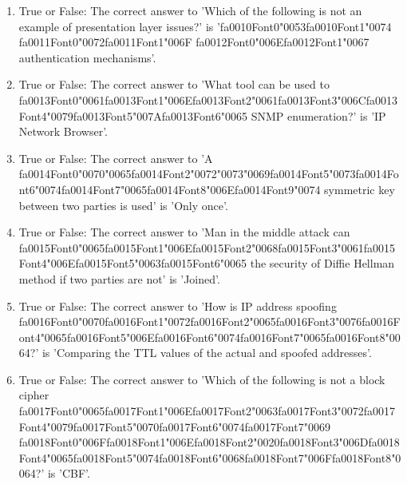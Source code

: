 \documentclass[12pt]{article}
\begin{document}
\begin{enumerate}[label=\arabic*.]
\item True or False: The correct answer to 'Which of the following is not an example of presentation layer issues?' is '{\csname fa0010Font0\endcsname\char"0053}{\csname fa0010Font1\endcsname\char"0074} {\csname fa0011Font0\endcsname\char"0072}{\csname fa0011Font1\endcsname\char"006F} {\csname fa0012Font0\endcsname\char"006E}{\csname fa0012Font1\endcsname\char"0067} authentication mechanisms'.
\item True or False: The correct answer to 'What tool can be used to {\csname fa0013Font0\endcsname\char"0061}{\csname fa0013Font1\endcsname\char"006E}{\csname fa0013Font2\endcsname\char"0061}{\csname fa0013Font3\endcsname\char"006C}{\csname fa0013Font4\endcsname\char"0079}{\csname fa0013Font5\endcsname\char"007A}{\csname fa0013Font6\endcsname\char"0065} SNMP enumeration?' is 'IP Network Browser'.
\item True or False: The correct answer to 'A {\csname fa0014Font0\endcsname\char"0070}{\char"0065}{\csname fa0014Font2\endcsname\char"0072}{\char"0073}{\char"0069}{\csname fa0014Font5\endcsname\char"0073}{\csname fa0014Font6\endcsname\char"0074}{\csname fa0014Font7\endcsname\char"0065}{\csname fa0014Font8\endcsname\char"006E}{\csname fa0014Font9\endcsname\char"0074} symmetric key between two parties is used' is 'Only once'.
\item True or False: The correct answer to 'Man in the middle attack can {\csname fa0015Font0\endcsname\char"0065}{\csname fa0015Font1\endcsname\char"006E}{\csname fa0015Font2\endcsname\char"0068}{\csname fa0015Font3\endcsname\char"0061}{\csname fa0015Font4\endcsname\char"006E}{\csname fa0015Font5\endcsname\char"0063}{\csname fa0015Font6\endcsname\char"0065} the security of Diffie Hellman method if two parties are not' is 'Joined'.
\item True or False: The correct answer to 'How is IP address spoofing {\csname fa0016Font0\endcsname\char"0070}{\csname fa0016Font1\endcsname\char"0072}{\csname fa0016Font2\endcsname\char"0065}{\csname fa0016Font3\endcsname\char"0076}{\csname fa0016Font4\endcsname\char"0065}{\csname fa0016Font5\endcsname\char"006E}{\csname fa0016Font6\endcsname\char"0074}{\csname fa0016Font7\endcsname\char"0065}{\csname fa0016Font8\endcsname\char"0064}?' is 'Comparing the TTL values of the actual and spoofed addresses'.
\item True or False: The correct answer to 'Which of the following is not a block cipher {\csname fa0017Font0\endcsname\char"0065}{\csname fa0017Font1\endcsname\char"006E}{\csname fa0017Font2\endcsname\char"0063}{\csname fa0017Font3\endcsname\char"0072}{\csname fa0017Font4\endcsname\char"0079}{\csname fa0017Font5\endcsname\char"0070}{\csname fa0017Font6\endcsname\char"0074}{\csname fa0017Font7\endcsname\char"0069} {\csname fa0018Font0\endcsname\char"006F}{\csname fa0018Font1\endcsname\char"006E}{\csname fa0018Font2\endcsname\char"0020}{\csname fa0018Font3\endcsname\char"006D}{\csname fa0018Font4\endcsname\char"0065}{\csname fa0018Font5\endcsname\char"0074}{\csname fa0018Font6\endcsname\char"0068}{\csname fa0018Font7\endcsname\char"006F}{\csname fa0018Font8\endcsname\char"0064}?' is 'CBF'.

\end{enumerate}
\end{document}
